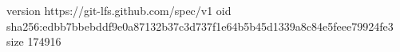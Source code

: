 version https://git-lfs.github.com/spec/v1
oid sha256:edbb7bbebddf9e0a87132b37c3d737f1e64b5b45d1339a8c84e5feee79924fe3
size 174916
